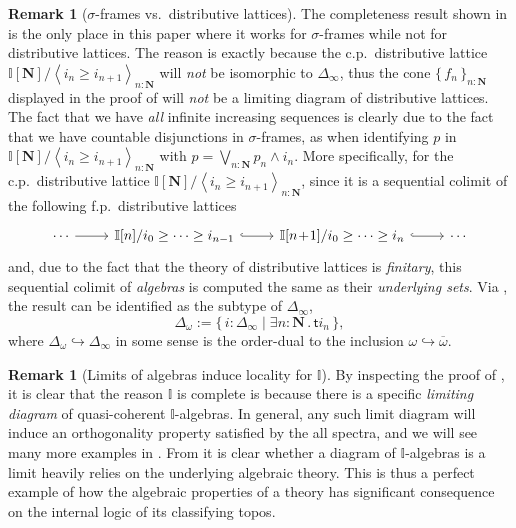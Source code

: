 \documentclass[12pt]{amsart}
\theoremstyle{definition}
\newtheorem{remark}[theorem]{Remark}
\newcommand{\mb}[1]{\mathbf{#1}}
\newcommand{\mbb}[1]{\mathbb{#1}}
\newcommand{\I}{\mbb I}
\newcommand{\ms}[1]{\mathsf{#1}}
\newcommand{\ov}[1]{\overline{#1}}
\newcommand{\set}[1]{\{\,#1\,\}}
\newcommand{\pair}[1]{\left\langle#1\right\rangle}
\newcommand{\scomp}[2]{\{\,#1\mid#2\,\}}
\newcommand{\hook}{\hookrightarrow}
\newcommand{\N}{\mb N}
\newcommand{\ex}[2]{\exists #1\!\colon\!\!#2\mathpunct{.}}
\begin{document}
\begin{remark}[$\sigma$-frames vs.\ distributive lattices]\label{rem:whynotdis}
  The completeness result shown in  is the only place in this paper where it works for $\sigma$-frames while not for distributive lattices. The reason is exactly because the c.p.\ distributive lattice $\I[\N]/\pair{i_n \ge i_{n+1}}_{n:\N}$ will \emph{not} be isomorphic to $\Delta_\infty$, thus the cone $\set{f_n}_{n:\N}$ displayed in the proof of  will \emph{not} be a limiting diagram of distributive lattices. The fact that we have \emph{all} infinite increasing sequences is clearly due to the fact that we have countable disjunctions in $\sigma$-frames, as when identifying $p$ in $\I[\N]/\pair{i_n \ge i_{n+1}}_{n:\N}$ with $p = \bigvee_{n:\N}p_n\wedge i_n$. More specifically, for the c.p.\ distributive lattice $\I[\N]/\pair{i_n \ge i_{n+1}}_{n:\N}$, since it is a sequential colimit of the following f.p.\ distributive lattices
  \[ 
  \begin{tikzcd}
    \cdots \ar[r] & \I[n]/i_{0} \ge \cdots \ge i_{n-1} \ar[r, hook] & \I[n\!+\!1]/i_0 \ge \cdots \ge i_n \ar[r, hook] & \cdots
  \end{tikzcd}
  \]
  and, due to the fact that the theory of distributive lattices is \emph{finitary}, this sequential colimit of \emph{algebras} is computed the same as their \emph{underlying sets}. Via , the result can be identified as the subtype of $\Delta_\infty$,
  \[ \Delta_\omega := \scomp{i : \Delta_\infty}{\ex n\N \ms ti_n}, \]
  where $\Delta_\omega \hook \Delta_\infty$ in some sense is the order-dual to the inclusion $\omega\hook\ov\omega$.
\end{remark}

\begin{remark}[Limits of algebras induce locality for $\I$]\label{rem:limofalgloc}
  By inspecting the proof of , it is clear that the reason $\I$ is complete is because there is a specific \emph{limiting diagram} of quasi-coherent $\I$-algebras. In general, any such limit diagram will induce an orthogonality property satisfied by the all spectra, and we will see many more examples in . From  it is clear whether a diagram of $\I$-algebras is a limit heavily relies on the underlying algebraic theory. This is thus a perfect example of how the algebraic properties of a theory has significant consequence on the internal logic of its classifying topos.
\end{remark}
\end{document}
